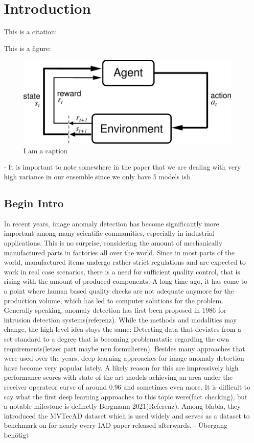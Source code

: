 \chapter{Introduction}
\label{chap:introduction}
This is a citation: \cite{patchCore2022}


This is a figure: 

\begin{figure}[ht]
    \centering
    \includegraphics[width=.5\textwidth]{figures/AgentEnviornment.png}
    \caption{I am a caption}
    \label{fig:my_label}
\end{figure}



- It is important to note somewhere in the paper that we are dealing with very high variance in our ensemble since we only have 5 models ish


\section{Begin Intro}
In recent years, image anomaly detection has become significantly more important among many scientific communities, especially in industrial applications. This is no surprise, considering the
amount of mechanically manufactured parts in factories all over the world. Since in most parts of the world, manufactured items undergo rather strict regulations and are expected to work
in real case scenarios, there is a need for sufficient quality control, that is rising with the amount of produced components. A long time ago, it has come to a point where human based quality 
checks are not adequate anymore for the production volume, which has led to computer solutions for the problem. Generally speaking, anomaly detection has first been proposed in 1986 for 
intrusion detection systems(referenz). While the methods and modalities may change, the high level idea stays the same: Detecting data that deviates from a set standard to a degree that is becoming
problematatic regarding the own requirements(letzer part maybe neu formulieren). Besides many approaches that were used over the years, deep learning approaches for image anomaly detection have
become very popular lately. A likely reason for this are impressively high performance scores with state of the art models achieving an area under the receiver operateor curve of around 0.96 and 
sometimes even more.
It is difficult to say what the first deep learning approaches to this topic were(fact checking), but a notable milestone is definetly Bergmann 2021(Referenz). Among blabla, they introduced
the MVTecAD dataset which is used widely and serves as a dataset to benchmark on for nearly every IAD paper released afterwards. - Übergang benötigt








